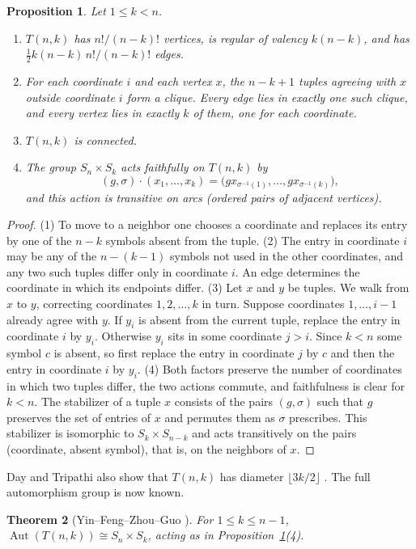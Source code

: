 \documentclass[12pt,letterpaper]{article}
\numberwithin{equation}{section}
\newtheorem{theorem}{Theorem}[section]
\newtheorem{proposition}[theorem]{Proposition}
\theoremstyle{definition}
\DeclareMathOperator{\autt}{Aut}
\begin{document}
\begin{proposition}\label{prop:arrbasic}
Let $1\leq k<n$.
\begin{enumerate}
\item $T(n,k)$ has $n!/(n-k)!$ vertices, is regular of valency $k(n-k)$, and has $\tfrac12 k(n-k)\,n!/(n-k)!$ edges.
\item For each coordinate $i$ and each vertex $x$, the $n-k+1$ tuples agreeing with $x$ outside coordinate $i$ form a clique. Every edge lies in exactly one such clique, and every vertex lies in exactly $k$ of them, one for each coordinate.
\item $T(n,k)$ is connected.
\item The group $S_n\times S_k$ acts faithfully on $T(n,k)$ by
\[
(g,\sigma)\cdot(x_1,\ldots,x_k)=\bigl(g x_{\sigma^{-1}(1)},\ldots,g x_{\sigma^{-1}(k)}\bigr),
\]
and this action is transitive on arcs (ordered pairs of adjacent vertices).
\end{enumerate}
\end{proposition}
\begin{proof}
(1) To move to a neighbor one chooses a coordinate and replaces its entry by one of the $n-k$ symbols absent from the tuple. (2) The entry in coordinate $i$ may be any of the $n-(k-1)$ symbols not used in the other coordinates, and any two such tuples differ only in coordinate $i$. An edge determines the coordinate in which its endpoints differ. (3) Let $x$ and $y$ be tuples. We walk from $x$ to $y$, correcting coordinates $1,2,\ldots,k$ in turn. Suppose coordinates $1,\ldots,i-1$ already agree with $y$. If $y_i$ is absent from the current tuple, replace the entry in coordinate $i$ by $y_i$. Otherwise $y_i$ sits in some coordinate $j>i$. Since $k<n$ some symbol $c$ is absent, so first replace the entry in coordinate $j$ by $c$ and then the entry in coordinate $i$ by $y_i$. (4) Both factors preserve the number of coordinates in which two tuples differ, the two actions commute, and faithfulness is clear for $k<n$. The stabilizer of a tuple $x$ consists of the pairs $(g,\sigma)$ such that $g$ preserves the set of entries of $x$ and permutes them as $\sigma$ prescribes. This stabilizer is isomorphic to $S_k\times S_{n-k}$ and acts transitively on the pairs (coordinate, absent symbol), that is, on the neighbors of $x$.
\end{proof}
Day and Tripathi also show that $T(n,k)$ has diameter $\lfloor 3k/2\rfloor$ \cite{DT92}. The full automorphism group is now known.
\begin{theorem}[Yin--Feng--Zhou--Guo \cite{YFZG21}]\label{thm:aut}
For $1\leq k\leq n-1$, $\autt(T(n,k))\cong S_n\times S_k$, acting as in Proposition~\ref{prop:arrbasic}(4).
\end{theorem}
\end{document}
